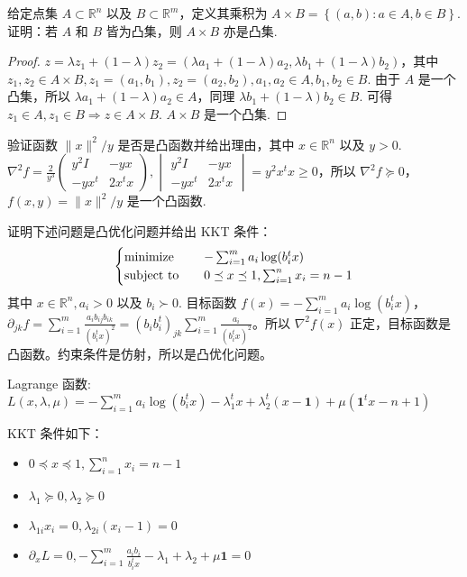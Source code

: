 \begin{problem}[问答]
    给定点集 $A\subset \mathbb{R}^n$ 以及 $B \subset \mathbb{R}^m$，定义其乘积为 $A \times B = \left\{(a, b): a \in A, b \in B\right\}$.证明：若 $A$ 和 $B$ 皆为凸集，则 $A \times B$ 亦是凸集.
    \begin{proof}
        $z = \lambda z_1 + (1 - \lambda)z_2 = (\lambda a_1 + (1 - \lambda)a_2, \lambda b_1 + (1 - \lambda)b_2)$，其中 $z_1, z_2 \in A \times B, z_1 = (a_1, b_1), z_2 = (a_2, b_2), a_1, a_2 \in A, b_1, b_2 \in B$. 由于 $A$ 是一个凸集，所以 $\lambda a_1 + (1 - \lambda)a_2 \in A$，同理 $\lambda b_1 + (1 - \lambda)b_2 \in B$. 可得 $z_1 \in A, z_1 \in B \Longrightarrow z \in A\times B$. $A \times B$ 是一个凸集.
    \end{proof}
\end{problem}

\begin{problem}[问答]
    验证函数 $\|x\|^2 / y$ 是否是凸函数并给出理由，其中 $x \in \mathbb{R}^n$ 以及 $y > 0$.
    \Answer $\nabla^2f = \frac{2}{y^3}\begin{pmatrix}
        y^2I & -yx \\
        -yx^t & 2x^tx
    \end{pmatrix}, \begin{vmatrix}
        y^2I & -yx \\
        -yx^t & 2x^tx
    \end{vmatrix} = y^2x^tx \ge 0$，所以 $\nabla^2f \succeq 0$，$f(x, y) = \|x\|^2 / y$ 是一个凸函数. 
\end{problem}

\begin{problem}[问答]
    证明下述问题是凸优化问题并给出 KKT 条件：\[\begin{cases}
        \operatorname{minimize} \quad &-\sum_{i = 1}^m a_i\log(b_i^tx)\\
        \operatorname{subject\ to} \quad &0 \preceq x \preceq 1, \sum_{i = 1}^nx_i = n - 1
    \end{cases}\] 其中 $x\in \mathbb{R}^n, a_i > 0$ 以及 $b_i \succ 0$.
    \Answer 目标函数 $f(x) = -\sum_{i = 1}^m a_i\log(b_i^tx)$，$\partial_{jk}f = \sum_{i = 1}^m\frac{a_ib_{ij}b_{ik}}{(b_i^tx)^2} = (b_ib_i^t)_{jk}\sum_{i = 1}^m\frac{a_i}{(b_i^tx)^2}$。所以 $\nabla^2f(x)$ 正定，目标函数是凸函数。约束条件是仿射，所以是凸优化问题。

    Lagrange 函数: $L(x, \lambda, \mu) = -\sum_{i = 1}^m a_i\log(b_i^tx) - \lambda_1^t x + \lambda_2^t(x - \mathbf{1}) + \mu(\mathbf{1}^tx - n + 1)$
    
    KKT 条件如下：\begin{itemize}
        \item $0 \preceq x \preceq 1, \sum_{i = 1}^nx_i = n - 1$
        \item $\lambda_1 \succeq 0, \lambda_2 \succeq 0$
        \item $\lambda_{1i}x_i = 0, \lambda_{2i}(x_i - 1) = 0$
        \item $\partial_xL = 0, -\sum_{i = 1}^m\frac{a_ib_i}{b_i^tx} - \lambda_1 + \lambda_2 + \mu \mathbf{1} = 0$
    \end{itemize}
\end{problem}

